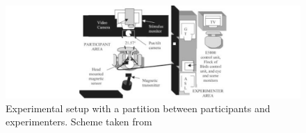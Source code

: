 \begin{figure}[h]
  \centering
  \includegraphics[width=.9\textwidth]{figures/andersonpartition-13.jpg}
  \caption[Example of partition setup]{Experimental setup with a partition between participants and experimenters. Scheme taken from \cite{anderson2006visualscanning}}
  \label{fig:partitionsetup}
\end{figure}